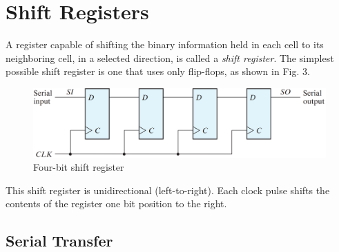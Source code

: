 \section{Shift Registers}
\label{sec:shift-registers}

A register capable of shifting the binary information held in each cell to its neighboring cell, in a selected direction, is called a \textit{shift register}.
The simplest possible shift register is one that uses only flip-flops, as shown in Fig. 3.
\begin{figure}[H]
  \centering
  \includegraphics[width=\linewidth]{img/fig-6.3.png}
  \caption{Four-bit shift register}
  \label{fig:6.3}
\end{figure}
\noindent This shift register is unidirectional (left-to-right). Each clock pulse shifts the contents of the register one bit position to the right.

\subsection{Serial Transfer}
\label{subsec:serial-transfer}

